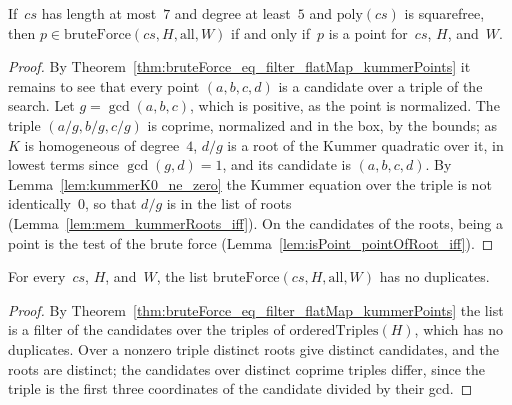\begin{theorem}\label{thm:mem_bruteForce_iff}
  \leanok
  If~$cs$ has length at most~$7$ and degree at least~$5$ and $\mathrm{poly}(cs)$ is squarefree,
  then $p \in \mathrm{bruteForce}(cs, H, \mathrm{all}, W)$ if and only if~$p$ is a point for~$cs$,
  $H$,  and~$W$.
\end{theorem}

\begin{proof}\leanok
  By Theorem~\ref{thm:bruteForce_eq_filter_flatMap_kummerPoints} it remains to see that every point
  $(a, b, c, d)$ is a candidate over a triple of the search. Let $g = \gcd(a, b, c)$, which is
  positive, as the point is normalized. The triple $(a/g, b/g, c/g)$ is coprime, normalized and in
  the box, by the bounds; as~$K$ is homogeneous of degree~$4$, $d/g$ is a root of the Kummer
  quadratic over it, in lowest terms since $\gcd(g, d) = 1$, and its candidate is $(a, b, c, d)$.
  By Lemma~\ref{lem:kummerK0_ne_zero} the Kummer equation over the triple is not identically~$0$,
  so that $d/g$ is in the list of roots (Lemma~\ref{lem:mem_kummerRoots_iff}). On the candidates
  of the roots, being a point is the test of the brute force
  (Lemma~\ref{lem:isPoint_pointOfRoot_iff}).
\end{proof}

\begin{theorem}\label{thm:nodup_bruteForce}
  \leanok
  For every~$cs$, $H$,  and~$W$, the list $\mathrm{bruteForce}(cs, H, \mathrm{all}, W)$
  has no duplicates.
\end{theorem}

\begin{proof}\leanok
  By Theorem~\ref{thm:bruteForce_eq_filter_flatMap_kummerPoints} the list is a filter of the
  candidates over the triples of $\mathrm{orderedTriples}(H)$, which has no duplicates. Over a
  nonzero triple distinct roots give distinct candidates, and the roots are distinct; the
  candidates over distinct coprime triples differ, since the triple is the first three coordinates
  of the candidate divided by their gcd.
\end{proof}

